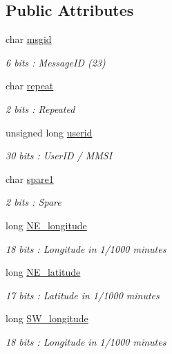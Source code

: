 \subsection*{Public Attributes}
\begin{DoxyCompactItemize}
\item 
char \mbox{\hyperlink{structaismsg__23_adc2906d66d6e0e2b2ebb76e6ef5b0b1b}{msgid}}
\begin{DoxyCompactList}\small\item\em 6 bits \+: Message\+ID (23) \end{DoxyCompactList}\item 
char \mbox{\hyperlink{structaismsg__23_a9c3cab8634e095e75fb284e7605adcd5}{repeat}}
\begin{DoxyCompactList}\small\item\em 2 bits \+: Repeated \end{DoxyCompactList}\item 
unsigned long \mbox{\hyperlink{structaismsg__23_a862fd5d6fb56e83c1f4aef145ac4850a}{userid}}
\begin{DoxyCompactList}\small\item\em 30 bits \+: User\+ID / M\+M\+SI \end{DoxyCompactList}\item 
char \mbox{\hyperlink{structaismsg__23_ad69c4e6c1a9e9e75a98bd920ef25a758}{spare1}}
\begin{DoxyCompactList}\small\item\em 2 bits \+: Spare \end{DoxyCompactList}\item 
long \mbox{\hyperlink{structaismsg__23_a3f871bfde4885f298021af1375f0ee9c}{N\+E\+\_\+longitude}}
\begin{DoxyCompactList}\small\item\em 18 bits \+: Longitude in 1/1000 minutes \end{DoxyCompactList}\item 
long \mbox{\hyperlink{structaismsg__23_a3471f451bd9702099dabe115f01bddff}{N\+E\+\_\+latitude}}
\begin{DoxyCompactList}\small\item\em 17 bits \+: Latitude in 1/1000 minutes \end{DoxyCompactList}\item 
long \mbox{\hyperlink{structaismsg__23_aee9f9133a81157e690760c342c13ea73}{S\+W\+\_\+longitude}}
\begin{DoxyCompactList}\small\item\em 18 bits \+: Longitude in 1/1000 minutes \end{DoxyCompactList}\item 

\end{DoxyCompactItemize}
